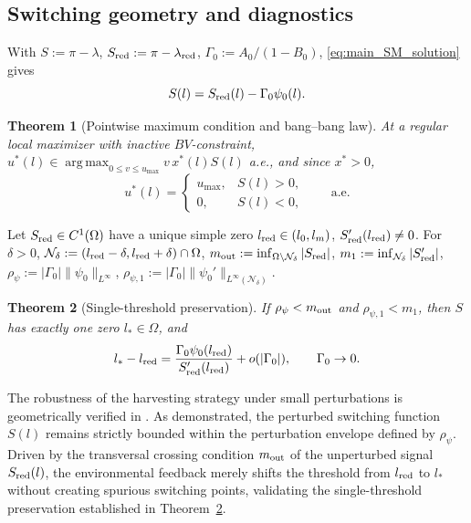 \documentclass[a4paper,fleqn,longmktitle]{cas-sc}
\theoremstyle{plain}
\newtheorem{theorem}{Theorem}[section]
\theoremstyle{definition}
\theoremstyle{remark}
\numberwithin{equation}{section}
\begin{document}
\subsection{Switching geometry and diagnostics}
\label{subsec:main_switching}
With \(S:=\pi-\lambda\), \(S_{\rm red}:=\pi-\lambda_{\rm red}\),
\(\Gamma_0:=A_0/(1-B_0)\), \eqref{eq:main_SM_solution} gives
\[
S(l)=S_{\rm red}(l)-\Gamma_0\psi_0(l).
\]
\begin{theorem}[Pointwise maximum condition and bang--bang law]
\label{thm:main_bang_bang}
At a regular local maximizer with inactive \(BV\)-constraint,
\(u^*(l)\in\operatorname*{arg\,max}_{0\le v\le u_{\max}}v\,x^*(l)S(l)\) a.e., and
since \(x^*>0\),
\begin{equation}
    \label{eq:main_bang_bang}
    u^*(l)=
    \begin{cases}
        u_{\max}, & S(l)>0,\\[1mm]
        0, & S(l)<0,
    \end{cases}
    \qquad
    \text{a.e.}
\end{equation}
\end{theorem}
Let \(S_{\rm red}\in C^1(\Omega)\) have a unique simple zero
\(l_{\rm red}\in(l_0,l_m)\), \(S_{\rm red}'(l_{\rm red})\ne0\). For
\(\delta>0\), \(\mathcal N_\delta:=(l_{\rm red}-\delta,l_{\rm red}+\delta)\cap\Omega\),
\(m_{\rm out}:=\inf_{\Omega\setminus\mathcal N_\delta}|S_{\rm red}|\),
\(m_1:=\inf_{\mathcal N_\delta}|S_{\rm red}'|\),
\(\rho_\psi:=|\Gamma_0|\|\psi_0\|_{L^\infty}\),
\(\rho_{\psi,1}:=|\Gamma_0|\|\psi_0'\|_{L^\infty(\mathcal N_\delta)}\).
\begin{theorem}[Single-threshold preservation]
\label{thm:main_single_threshold}
If \(\rho_\psi<m_{\rm out}\) and \(\rho_{\psi,1}<m_1\), then \(S\) has exactly
one zero \(l_*\in\Omega\), and
\begin{equation}
    \label{eq:main_threshold_shift}
    l_*-l_{\rm red}
    =
    \frac{\Gamma_0\psi_0(l_{\rm red})}
    {S_{\rm red}'(l_{\rm red})}
    +
    o(|\Gamma_0|),
    \qquad
    \Gamma_0\to0.
\end{equation}
\end{theorem}

The robustness of the harvesting strategy under small perturbations is geometrically verified in . As demonstrated, the perturbed switching function $S(l)$ remains strictly bounded within the perturbation envelope defined by $\rho_\psi$. Driven by the transversal crossing condition $m_{\rm out}$ of the unperturbed signal $S_{\rm red}(l)$, the environmental feedback merely shifts the threshold from $l_{\rm red}$ to $l_*$ without creating spurious switching points, validating the single-threshold preservation established in Theorem~\ref{thm:main_single_threshold}.
\end{document}
